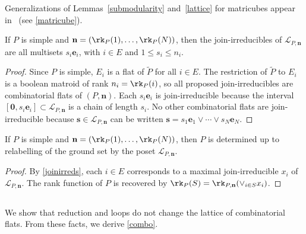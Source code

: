 Generalizations of Lemmas~\ref{submodularity} and~\ref{lattice} for matricubes appear in~\cite[Theorem~3.4]{AG24} (see \cref{matricube}).

\begin{lemm}\label{joinirreds}
  If $P$ is simple and $\mathbf n = (\rk_P(1), \ldots, \rk_P(N))$, then the join-irreducibles of $\mathcal L_{P, \mathbf n}$ are all multisets $s_i \mathbf e_i$, with $i \in E$ and $1 \leq s_i \leq n_i$.
\end{lemm}
\begin{proof}
  Since $P$ is simple, $E_i$ is a flat of $\widetilde P$ for all $i \in E$.
  The restriction of $\widetilde P$ to $E_i$ is a boolean matroid of rank $n_i = \rk_P(i)$, so all proposed join-irreducibles are combinatorial flats of $(P, \mathbf n)$.
  Each $s_i \mathbf e_i$ is join-irreducible because the interval $[\mathbf 0, s_i \mathbf e_i] \subset \mathcal L_{P, \mathbf n}$ is a chain of length $s_i$.
  No other combinatorial flats are join-irreducible because $\mathbf s \in \mathcal L_{P, \mathbf n}$ can be written $\mathbf s = s_1 \mathbf e_1 \vee \cdots \vee s_N \mathbf e_N$.
\end{proof}
\begin{coro}\label{determined}
  If $P$ is simple and $\mathbf n = (\rk_P(1), \ldots, \rk_P(N))$, then $P$ is determined up to relabelling of the ground set by the poset $\mathcal L_{P, \mathbf n}$.
\end{coro}
\begin{proof}
  By \cref{joinirreds}, each $i \in E$ corresponds to a maximal join-irreducible $x_i$ of~$\mathcal L_{P, \mathbf n}$.
  The rank function of $P$ is recovered by $\rk_P(S) = \rk_{P, \mathbf n}(\vee_{i \in S} x_i)$.
\end{proof}

\subsection{} \label{comboflatsimplification}
We show that reduction and loops do not change the lattice of combinatorial flats.
From these facts, we derive \cref{combo}.

